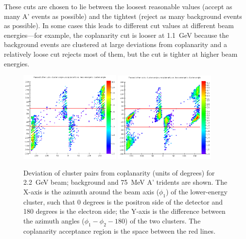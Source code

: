 These cuts are chosen to lie between the loosest reasonable values (accept as many A' events as possible) and the tightest (reject as many background events as possible). In some cases this leads to different cut values at different beam energies---for example, the coplanarity cut is looser at 1.1~GeV because the background events are clustered at large deviations from coplanarity and a relatively loose cut rejects most of them, but the cut is tighter at higher beam energies.

\begin{figure}[ht]
	\includegraphics[width=0.45\textwidth]{performance/trigger/coplanarity_22}
	\includegraphics[width=0.45\textwidth]{performance/trigger/coplanarity_22_075mev}
	\caption{\small{Deviation of cluster pairs from coplanarity (units of degrees) for 2.2~GeV beam; background and 75~MeV A' tridents are shown. The X-axis is the azimuth around the beam axis ($\phi_1$) of the lower-energy cluster, such that 0 degrees is the positron side of the detector and 180 degrees is the electron side; the Y-axis is the difference between the azimuth angles ($\phi_1-\phi_2 - 180$) of the two clusters. The coplanarity acceptance region is the space between the red lines.}}
	\label{fig:coplanarity}
\end{figure}

